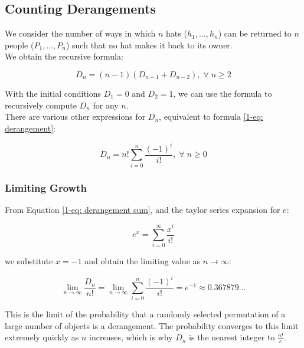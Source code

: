 \documentclass{article}
\begin{document}
\subsection{Counting Derangements}
We consider the number of ways in which $n$ hats ($h_{1}, \dots, h_n$) can be returned to $n$ people ($P_{1}, \dots, P_n$) such that no hat makes it back to its owner. \\

We obtain the recursive formula:

\begin{equation}\label{1-eq: derangement}
    D_n = (n-1)(D_{n-1} + D_{n-2}), \; \forall \; n \geq 2
\end{equation}

\noindent With the initial conditions $D_{1} = 0$ and $D_{2} = 1$, we can use the formula to recursively compute $D_n$ for any $n$. \\

\noindent There are various other expressions for $D_n$, equivalent to formula \ref{1-eq: derangement}:

\begin{equation}\label{1-eq: derangement sum}
    D_n = n! \sum_{i=0}^{n} \frac{(-1)^{i}}{i!}, \; \forall \; n \geq 0
\end{equation}

\subsubsection{Limiting Growth}
From Equation \ref{1-eq: derangement sum}, and the taylor series expansion for $e$:

\begin{equation}
    e^{x} = \sum_{i=0}^{\infty} \frac{x^{i}}{i!} 
\end{equation}

\noindent we substitute $x=-1$ and obtain the limiting value as $n \to \infty$:

\begin{equation*}
    \lim_{n \to \infty} \frac{D_n}{n!} = \lim_{n \to \infty} \sum_{i=0}^{n} \frac{(-1)^{i}}{i!} = e^{-1} \approx 0.367879\dots
\end{equation*}

\noindent This is the limit of the probability that a randomly selected permutation of a large number of objects is a derangement. The probability converges to this limit extremely quickly as $n$ increases, which is why $D_n$ is the nearest integer to $\frac{n!}{e}$. 
\end{document}
